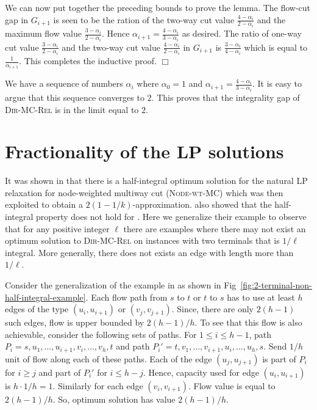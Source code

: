\documentclass[11pt]{article}
\renewenvironment{proof}{\vspace{-0.1in}\noindent{\bf Proof:}}{\hspace*{\fill}$\Box$\par}
\def\2DirMC{\text{$st$-Bi-Cut}\xspace}
\def\NodeMC{\textsc{Node-wt-MC}\xspace}
\def\DirMCRel{\textsc{Dir-MC-Rel}\xspace}
\def\NodeMC{\textsc{Node-wt-MC}\xspace}
\begin{document}
\begin{proof}
  \medskip We can now put together the preceding bounds to prove the
  lemma.  The flow-cut gap in $G_{i+1}$ is seen to be the ration of
  the two-way cut value $\frac{4 - \alpha_i}{2-\alpha_i}$ and the
  maximum flow value $\frac{3- \alpha_i}{2- \alpha_i}$. Hence
  $\alpha_{i+1} = \frac{4 - \alpha_i}{3 - \alpha_i}$ as desired.  The
  ratio of one-way cut value $\frac{3 - \alpha_i}{2-\alpha_i}$ and the
  two-way cut value $\frac{4 - \alpha_i}{2-\alpha_i}$ in $G_{i+1}$ is
  $\frac{3 - \alpha_i}{4 - \alpha_i}$ which is equal to
  $\frac{1}{\alpha_{i+1}}$. This completes the inductive proof.
\end{proof}

\medskip
We have a sequence of numbers $\alpha_i$ where $\alpha_0 = 1$ and
$\alpha_{i+1} = \frac{4-\alpha_i}{3 - \alpha_i}$. It is easy to argue
that this sequence converges to $2$. This proves that the integrality
gap of \DirMCRel is in the limit equal to $2$.

\section{Fractionality of the LP solutions}
\label{sec:fractionality}
It was shown in \cite{GargVY04} that there is a half-integral optimum
solution for the natural LP relaxation for node-weighted multiway cut
(\NodeMC) which was then exploited to obtain a
$2(1-1/k)$-approximation.  \cite{GargVY04} also showed that the
half-integral property does not hold for \2DirMC. Here we generalize
their example to observe that for any positive integer $\ell$ there are
examples where there may not exist an optimum solution to \DirMCRel on
instances with two terminals that is $1/\ell$ integral. More generally,
there does not exists an edge with length more than $1/\ell$.

Consider the generalization of the example in \cite{GargVY04} as shown
in Fig~\ref{fig:2-terminal-non-half-integral-example}.  Each flow path
from $s$ to $t$ or $t$ to $s$ has to use at least $h$ edges of the
type $(u_i,u_{i+1})$ or $(v_j,v_{j+1})$. Since, there are only
$2(h-1)$ such edges, flow is upper bounded by $2(h-1)/h$. To see that
this flow is also achievable, consider the following sets of
paths. For $1\leq i \leq h-1$, path $P_i = s, u_1,\ldots,u_{i+1},
v_i,\ldots,v_h,t$ and path $P_i' =
t,v_1,\ldots,v_{i+1},u_i,\ldots,u_h,s$. Send $1/h$ unit of flow along
each of these paths. Each of the edge $(u_j,u_{j+1})$ is part of $P_i$
for $i \geq j$ and part of $P_i'$ for $i \leq h-j$. Hence, capacity
used for edge $(u_i,u_{i+1})$ is $h\cdot 1/h=1$. Similarly for each
edge $(v_i,v_{i+1})$. Flow value is equal to $2(h-1)/h$. So, optimum
solution has value $2(h-1)/h$.
\end{document}
